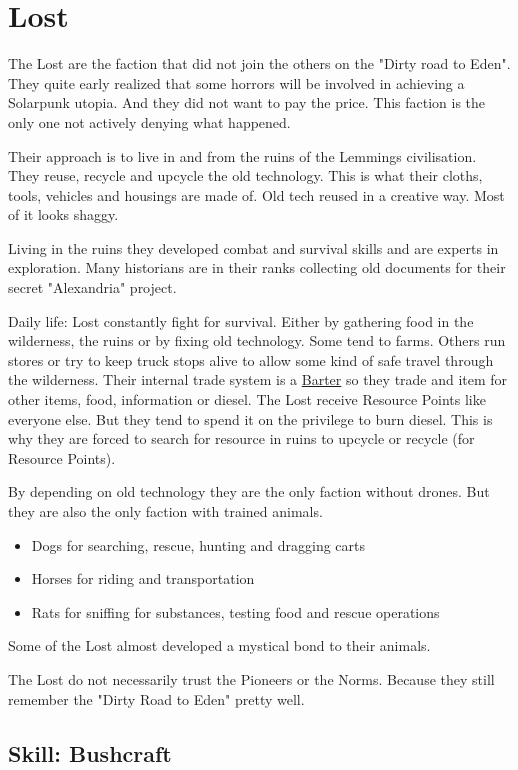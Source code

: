 \section{Lost}

The Lost are the faction that did not join the others on the "Dirty road to Eden". They quite early realized that some horrors will be involved in achieving a Solarpunk utopia. And they did not want to pay the price. This faction is the only one not actively denying what happened.

Their approach is to live in and from the ruins of the Lemmings civilisation. They reuse, recycle and upcycle the old technology. This is what their cloths, tools, vehicles and housings are made of. Old tech reused in a creative way. Most of it looks shaggy.

Living in the ruins they developed combat and survival skills and are experts in exploration.
Many historians are in their ranks collecting old documents for their secret "Alexandria" project.

Daily life: Lost constantly fight for survival. Either by gathering food in the wilderness, the ruins or by fixing old technology. Some tend to farms. Others run stores or try to keep truck stops alive to allow some kind of safe travel through the wilderness. Their internal trade system is a \hyperref[sec:Barter]{Barter} so they trade and item for other items, food, information or diesel.
The Lost receive Resource Points like everyone else. But they tend to spend it on the privilege to burn diesel. This is why they are forced to search for resource in ruins to upcycle or recycle (for Resource Points).

By depending on old technology they are the only faction without drones. But they are also the only faction with trained animals.

\begin{itemize}
    \item Dogs for searching, rescue, hunting and dragging carts
    \item Horses for riding and transportation
    \item Rats for sniffing for substances, testing food and rescue operations
\end{itemize}
Some of the Lost almost developed a mystical bond to their animals.

The Lost do not necessarily trust the Pioneers or the Norms. Because they still remember the "Dirty Road to Eden" pretty well.

\subsection{Skill: Bushcraft}

